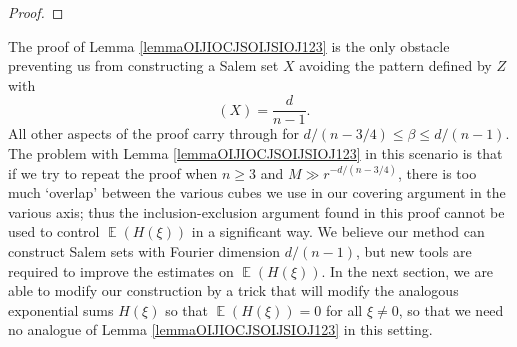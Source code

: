 \documentclass[dvipsnames,letterpaper,12pt]{article}
\numberwithin{equation}{section}
\DeclareMathOperator{\fordim}{\dim_{\mathbb{F}}}
\DeclareMathOperator{\ZZ}{\mathbb{Z}}
\DeclareMathOperator{\TT}{\mathbb{T}}
\numberwithin{theorem}{section}
\DeclareMathOperator{\EE}{\mathbb{E}}
\begin{document}
\begin{proof}
\end{proof}

The proof of Lemma \ref{lemmaOIJIOCJSOIJSIOJ123} is the only obstacle preventing us from constructing a Salem set $X$ avoiding the pattern defined by $Z$ with
%
\[ \fordim(X) = \frac{d}{n-1}. \]
%
All other aspects of the proof carry through for $d/(n-3/4) \leq \beta \leq d/(n-1)$. The problem with Lemma \ref{lemmaOIJIOCJSOIJSIOJ123} in this scenario is that if we try to repeat the proof when $n \geq 3$ and $M \gg r^{-d/(n-3/4)}$, there is too much `overlap' between the various cubes we use in our covering argument in the various axis; thus the inclusion-exclusion argument found in this proof cannot be used to control $\EE(H(\xi))$ in a significant way. We believe our method can construct Salem sets with Fourier dimension $d/(n-1)$, but new tools are required to improve the estimates on $\EE(H(\xi))$. In the next section, we are able to modify our construction by a trick that will modify the analogous exponential sums $H(\xi)$ so that $\EE(H(\xi)) = 0$ for all $\xi \neq 0$, so that we need no analogue of Lemma \ref{lemmaOIJIOCJSOIJSIOJ123} in this setting.
\end{document}
